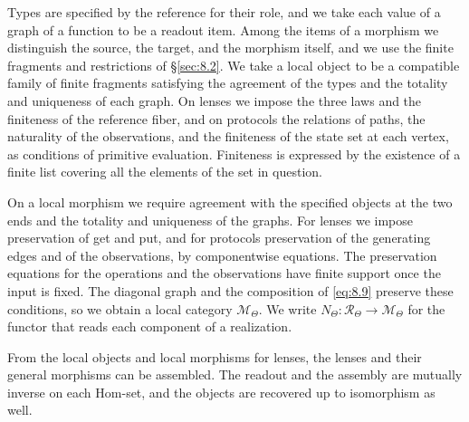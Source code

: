 \begin{construction}
Types are specified by the reference for their role, and we take each value of a graph of a
function to be a readout item.
Among the items of a morphism we distinguish the source, the target, and the morphism itself,
and we use the finite fragments and restrictions of \S\ref{sec:8.2}.
We take a local object to be a compatible family of finite fragments satisfying the agreement
of the types and the totality and uniqueness of each graph.
On lenses we impose the three laws and the finiteness of the reference fiber, and on protocols
the relations of paths, the naturality of the observations, and the finiteness of the state
set at each vertex, as conditions of primitive evaluation.
Finiteness is expressed by the existence of a finite list covering all the elements of the set
in question.

On a local morphism we require agreement with the specified objects at the two ends and the
totality and uniqueness of the graphs.
For lenses we impose preservation of get and put, and for protocols preservation of the
generating edges and of the observations, by componentwise equations.
The preservation equations for the operations and the observations have finite support once
the input is fixed.
The diagonal graph and the composition of \eqref{eq:8.9} preserve these conditions, so we
obtain a local category $\mathcal{M}_\Theta$.
We write $N_\Theta:\mathcal{R}_\Theta\to\mathcal{M}_\Theta$ for the functor that reads each
component of a realization.

\end{construction}

\begin{lemma}\label{lem:8.23}

From the local objects and local morphisms for lenses, the lenses and their general morphisms
can be assembled.
The readout and the assembly are mutually inverse on each Hom-set, and the objects are
recovered up to isomorphism as well.

\end{lemma}


